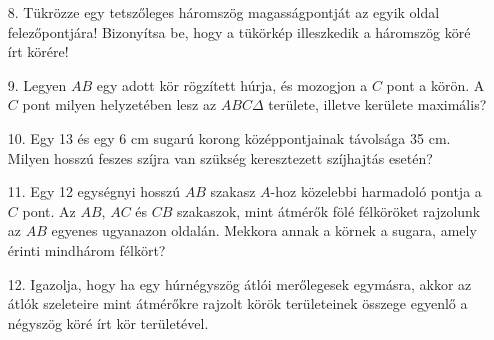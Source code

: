 \documentclass[a4paper,11pt]{article}
\begin{document}
\begin{enumerate}
\item[8. \quad] Tükrözze egy tetszőleges háromszög magasságpontját az egyik oldal felezőpontjára! Bizonyítsa be, hogy a tükörkép illeszkedik a háromszög köré írt körére!
\item[9. \quad] Legyen $AB$ egy adott kör rögzített húrja, és mozogjon a $C$ pont a körön. A $C$ pont milyen helyzetében lesz az $ABC \Delta$ területe, illetve kerülete maximális?
\item[10. \quad] Egy 13 és egy 6 cm sugarú korong középpontjainak távolsága 35 cm. Milyen hosszú feszes szíjra van szükség keresztezett szíjhajtás esetén?
\item[11. \quad] Egy 12 egységnyi hosszú $AB$ szakasz $A$-hoz közelebbi harmadoló pontja a $C$ pont. Az $AB$, $AC$ és $CB$ szakaszok, mint átmérők fölé félköröket rajzolunk az $AB$ egyenes ugyanazon oldalán. Mekkora annak a körnek a sugara, amely érinti mindhárom félkört?
\item[12. \quad] Igazolja, hogy ha egy húrnégyszög átlói merőlegesek egymásra, akkor az átlók szeleteire mint átmérőkre rajzolt körök területeinek összege egyenlő a négyszög köré írt kör területével.
\end{enumerate}
\end{document}

